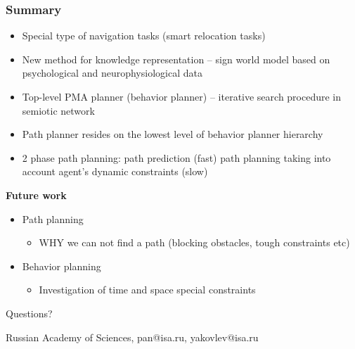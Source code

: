 \documentclass[default]{beamer}
\begin{document}
	\begin{frame}
		\frametitle{Summary}
		\begin{itemize}
			\item Special type of navigation tasks (smart relocation tasks) 
			\item New method for knowledge representation -- sign world model based on psychological and neurophysiological data
			\item Top-level PMA planner (behavior planner) -- iterative search procedure in semiotic network
			\item Path planner resides on the lowest level of behavior planner hierarchy
			\item 2 phase path planning: path prediction (fast) path planning taking into account agent’s dynamic constraints (slow)
		\end{itemize}
		\par\bigskip
		\textbf{Future work}
		\begin{itemize}
			\item Path planning
			\begin{itemize}
				\item WHY we can not find a path (blocking obstacles, tough constraints etc)
			\end{itemize}
			\item Behavior planning
			\begin{itemize}
				\item Investigation of time and space special constraints
			\end{itemize}
		\end{itemize}
		
	\end{frame}
								
	\begin{frame}
		\centering
		\Huge
		Questions?
		\normalsize
		\par\bigskip
		\par\bigskip
		Russian Academy of Sciences, pan@isa.ru, yakovlev@isa.ru
	\end{frame}
									
	
\end{document}
